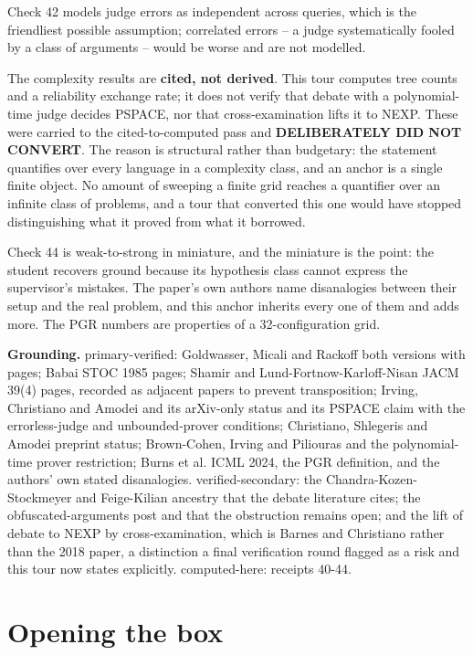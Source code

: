 Check 42 models judge errors as independent across queries, which is the friendliest possible assumption; correlated errors -- a judge systematically fooled by a class of arguments -- would be worse and are not modelled.

The complexity results are \textbf{cited, not derived}. This tour computes tree counts and a reliability exchange rate; it does not verify that debate with a polynomial-time judge decides PSPACE, nor that cross-examination lifts it to NEXP. These were carried to the cited-to-computed pass and \textbf{DELIBERATELY DID NOT CONVERT}. The reason is structural rather than budgetary: the statement quantifies over every language in a complexity class, and an anchor is a single finite object. No amount of sweeping a finite grid reaches a quantifier over an infinite class of problems, and a tour that converted this one would have stopped distinguishing what it proved from what it borrowed.

Check 44 is weak-to-strong in miniature, and the miniature is the point: the student recovers ground because its hypothesis class cannot express the supervisor's mistakes. The paper's own authors name disanalogies between their setup and the real problem, and this anchor inherits every one of them and adds more. The PGR numbers are properties of a 32-configuration grid.

\textbf{Grounding.} primary-verified: Goldwasser, Micali and Rackoff both versions with pages; Babai STOC 1985 pages; Shamir and Lund-Fortnow-Karloff-Nisan JACM 39(4) pages, recorded as adjacent papers to prevent transposition; Irving, Christiano and Amodei and its arXiv-only status and its PSPACE claim with the errorless-judge and unbounded-prover conditions; Christiano, Shlegeris and Amodei preprint status; Brown-Cohen, Irving and Piliouras and the polynomial-time prover restriction; Burns et al. ICML 2024, the PGR definition, and the authors' own stated disanalogies. verified-secondary: the Chandra-Kozen-Stockmeyer and Feige-Kilian ancestry that the debate literature cites; the obfuscated-arguments post and that the obstruction remains open; and the lift of debate to NEXP by cross-examination, which is Barnes and Christiano rather than the 2018 paper, a distinction a final verification round flagged as a risk and this tour now states explicitly. computed-here: receipts 40-44.

\chapter{Opening the box}

